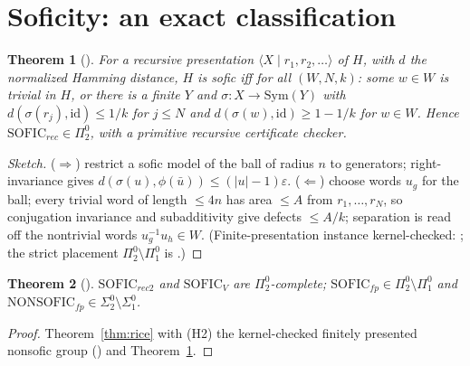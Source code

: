 \documentclass[11pt]{article}
\newtheorem{theorem}{Theorem}[section]
\theoremstyle{definition}
\newcommand{\Pizt}{\Pi^0_2}\newcommand{\Sizt}{\Sigma^0_2}\newcommand{\Pith}{\Pi^0_3}\newcommand{\Sith}{\Sigma^0_3}
\newcommand{\Sio}{\Sigma^0_1}\newcommand{\Pio}{\Pi^0_1}
\begin{document}
\section{Soficity: an exact classification}
\begin{theorem}[]\label{thm:sofup}
For a recursive presentation $\langle X\mid r_1,r_2,\dots\rangle$ of $H$, with $d$ the normalized Hamming distance,
$H$ is sofic iff for all $(W,N,k)$: some $w\in W$ is trivial in $H$, or there is a finite $Y$ and $\sigma:X\to\mathrm{Sym}(Y)$ with $d(\sigma(r_j),\mathrm{id})\le 1/k$ for $j\le N$ and $d(\sigma(w),\mathrm{id})\ge 1-1/k$ for $w\in W$. Hence $\mathrm{SOFIC}_{rec}\in\Pizt$, with a primitive recursive certificate checker.
\end{theorem}
\begin{proof}[Sketch]
($\Rightarrow$) restrict a sofic model of the ball of radius $n$ to generators; right-invariance gives $d(\sigma(u),\phi(\bar u))\le(|u|-1)\varepsilon$. ($\Leftarrow$) choose words $u_g$ for the ball; every trivial word of length $\le 4n$ has area $\le A$ from $r_1,\dots,r_N$, so conjugation invariance and subadditivity give defects $\le A/k$; separation is read off the nontrivial words $u_g^{-1}u_h\in W$. (Finite-presentation instance kernel-checked: ; the strict placement $\Pizt\setminus\Pio$ is .)
\end{proof}
\begin{theorem}[]
$\mathrm{SOFIC}_{rec2}$ and $\mathrm{SOFIC}_V$ are $\Pizt$-complete; $\mathrm{SOFIC}_{fp}\in\Pizt\setminus\Pio$ and $\mathrm{NONSOFIC}_{fp}\in\Sizt\setminus\Sio$.
\end{theorem}
\begin{proof} Theorem~\ref{thm:rice} with (H2) the kernel-checked finitely presented nonsofic group () and Theorem~\ref{thm:sofup}. \end{proof}
\end{document}
